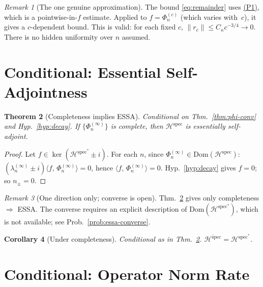 \documentclass[12pt,a4paper]{amsart}
\newtheorem{theorem}{Theorem}[section]
\newtheorem{corollary}[theorem]{Corollary}
\theoremstyle{definition}
\theoremstyle{remark}
\newtheorem{remark}[theorem]{Remark}
\newcommand{\ip}[2]{\langle #1,\, #2\rangle}
\newcommand{\Hspec}{\mathcal{H}^{\mathrm{spec}}}
\newcommand{\Dom}{\mathrm{Dom}}
\begin{document}
\begin{remark}[The one genuine approximation]
\label{rem:genuine-approx}
The bound \eqref{eq:remainder} uses \hyperref[P1]{(P1)},
which is a pointwise-in-$f$ estimate.
Applied to $f=\Phi_n^{(c)}$ (which varies with~$c$),
it gives a $c$-dependent bound.
This is valid: for each fixed $c$,
$\|r_c\|\le C_\kappa c^{-3/4}\to 0$.
There is no hidden uniformity over $n$ assumed.
\end{remark}

\section{Conditional: Essential Self-Adjointness}
\label{sec:esa}

\begin{theorem}[Completeness implies ESSA]
\label{thm:esa}
\emph{Conditional on
Thm.~\ref{thm:phi-conv} and Hyp.~\ref{hyp:decay}.}
If $\{\Phi_n^{(\infty)}\}$ is complete, then $\Hspec$
is essentially self-adjoint.
\end{theorem}

\begin{proof}
Let $f\in\ker(\Hspec^*\pm i)$.
For each $n$, since $\Phi_n^{(\infty)}\in\Dom(\Hspec)$:
$(\lambda_n^{(\infty)}\pm i)\ip{f}{\Phi_n^{(\infty)}}=0$,
hence $\ip{f}{\Phi_n^{(\infty)}}=0$.
Hyp.~\ref{hyp:decay} gives $f=0$; so $n_\pm=0$.
\end{proof}

\begin{remark}[One direction only; converse is open]
\label{rem:essa-one-direction}
Thm.~\ref{thm:esa} gives only completeness
$\Rightarrow$ ESSA.
The converse requires an explicit description
of $\Dom(\Hspec^*)$, which is not available;
see Prob.~\ref{prob:essa-converse}.
\end{remark}

\begin{corollary}[Under completeness]
\label{cor:esa}
\emph{Conditional as in Thm.~\ref{thm:esa}.}
$\overline{\Hspec}=\Hspec^*$.
\end{corollary}

\section{Conditional: Operator Norm Rate}
\label{sec:opnorm}
\end{document}
